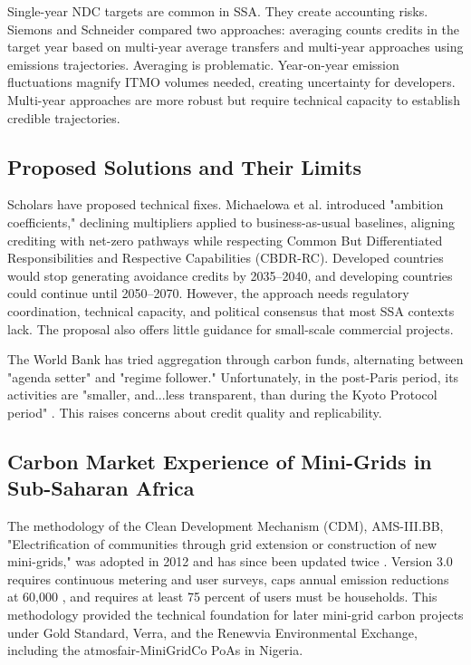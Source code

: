 Single-year NDC targets are common in SSA. They create accounting risks. Siemons and Schneider \cite{siemons-accounting} compared two approaches: averaging counts credits in the target year based on multi-year average transfers and multi-year approaches using emissions trajectories. Averaging is problematic. Year-on-year emission fluctuations magnify ITMO volumes needed, creating uncertainty for developers. Multi-year approaches are more robust but require technical capacity to establish credible trajectories.

\subsection{Proposed Solutions and Their Limits}
\label{subsec:lit-solutions}
Scholars have proposed technical fixes. Michaelowa et al. \cite{michaelowa-towards} introduced "ambition coefficients," declining multipliers applied to business-as-usual baselines, aligning crediting with net-zero pathways while respecting Common But Differentiated Responsibilities and Respective Capabilities (CBDR-RC). Developed countries would stop generating avoidance credits by 2035–2040, and developing countries could continue until 2050–2070. However, the approach needs regulatory coordination, technical capacity, and political consensus that most SSA contexts lack. The proposal also offers little guidance for small-scale commercial projects.

The World Bank has tried aggregation through carbon funds, alternating between "agenda setter" and "regime follower." Unfortunately, in the post-Paris period, its activities are "smaller, and...less transparent, than during the Kyoto Protocol period" \cite{michaelowa-catalysing}. This raises concerns about credit quality and replicability.

\subsection{Carbon Market Experience of Mini-Grids in Sub-Saharan Africa}
\label{subsec:vcm-experience}
The methodology of the Clean Development Mechanism (CDM), AMS-III.BB, "Electrification of communities through grid extension or construction of new mini-grids," was adopted in 2012 and has since been updated twice \cite{unfccc-ams-iii-bb}. Version 3.0 requires continuous metering and user surveys, caps annual emission reductions at 60,000 \tcooe, and requires at least 75 percent of users must be households. This methodology provided the technical foundation for later mini-grid carbon projects under Gold Standard, Verra, and the Renewvia Environmental Exchange, including the atmosfair-MiniGridCo PoAs in Nigeria.

